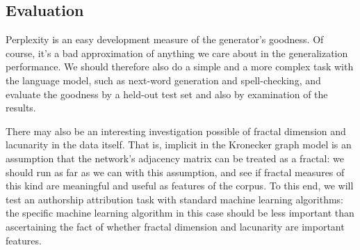 \documentclass[12pt]{article}
\begin{document}
\subsection{Evaluation}
Perplexity is an easy development measure of the generator's goodness. Of course, it's a bad approximation of anything we care about in the generalization performance. We should therefore also do a simple and a more complex task with the language model, such as next-word generation and spell-checking, and evaluate the goodness by a held-out test set and also by examination of the results.

There may also be an interesting investigation possible of fractal dimension \cite{fractaldim} and lacunarity \cite{lacunarity} in the data itself. That is, implicit in the Kronecker graph model is an assumption that the network's adjacency matrix can be treated as a fractal: we should run as far as we can with this assumption, and see if fractal measures of this kind are meaningful and useful as features of the corpus. To this end, we will test an authorship attribution task with standard machine learning algorithms: the specific machine learning algorithm in this case should be less important than ascertaining the fact of whether fractal dimension and lacunarity are important features.

\begin{thebibliography}{99}
\end{thebibliography}
\end{document}
